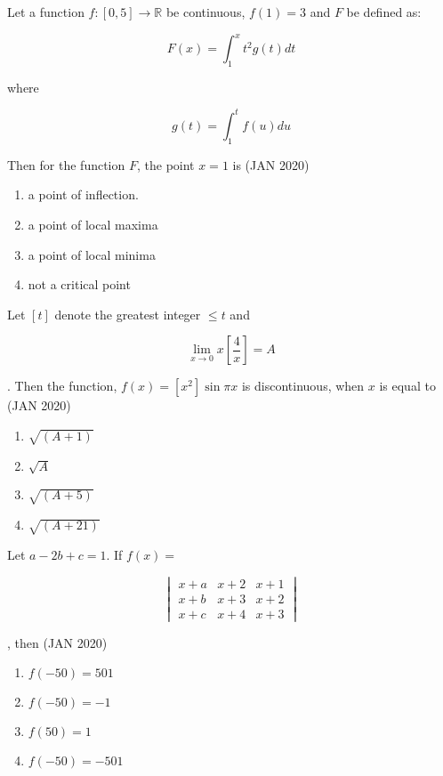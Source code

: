     \item Let a function $f:[0,5] \rightarrow \mathbb{R}$ be continuous, $f(1) = 3$ and $F$ be defined as:

        \[F(x) = \int_{1}^{x}t^{2}g(t)dt\]
        
        where
        
        \[g(t) = \int_{1}^{t}f(u)du\]
        
        Then for the function $F$, the point $x=1$ is \hfill{(JAN 2020)}
        
        \begin{enumerate}
        \item a point of inflection.
        \item a point of local maxima
        \item a point of local minima
        \item not a critical point
        \end{enumerate}

    \item Let $[t]$ denote the greatest integer $\leq t$ and

        \[\lim_{x\rightarrow0}x\left[\frac{4}{x}\right] = A\]
        
        . Then the function, $f(x)=[x^{2}] \sin \pi x$ is discontinuous, when $x$ is equal to \hfill{(JAN 2020)}
        
        \begin{enumerate}
        \item $\sqrt{(A+1)}$
        \item $\sqrt{A}$
        \item $\sqrt{(A+5)}$
        \item $\sqrt{(A+21)}$
        \end{enumerate}

    \item Let $a-2b+c=1$. If $f(x)=$

        \[\begin{vmatrix}
        x+a & x+2 & x+1 \\
        x+b & x+3 & x+2 \\
        x+c & x+4 & x+3
        \end{vmatrix}\]
        
        , then \hfill{(JAN 2020)}
        
        \begin{enumerate}
        \item $f(-50)=501$
        \item $f(-50)=-1$
        \item $f(50)=1$
        \item $f(-50)=-501$
        \end{enumerate}
        
